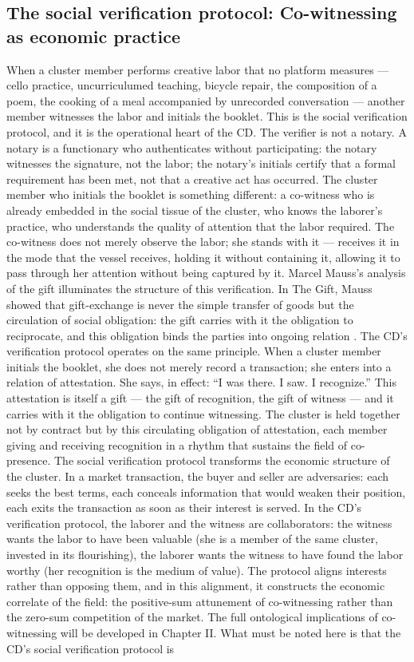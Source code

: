 \subsection{The social verification protocol: Co-witnessing as economic practice}

When a cluster member performs creative labor that no platform measures — cello practice, uncurriculumed teaching, bicycle repair, the composition of a poem, the cooking of a meal accompanied by unrecorded conversation — another member witnesses the labor and initials the booklet. This is the social verification protocol, and it is the operational heart of the CD. The verifier is not a notary. A notary is a functionary who authenticates without participating: the notary witnesses the signature, not the labor; the notary’s initials certify that a formal requirement has been met, not that a creative act has occurred. The cluster member who initials the booklet is something different: a co-witness who is already embedded in the social tissue of the cluster, who knows the laborer’s practice, who understands the quality of attention that the labor required. The co-witness does not merely observe the labor; she stands with it — receives it in the mode that the vessel receives, holding it without containing it, allowing it to pass through her attention without being captured by it. Marcel Mauss’s analysis of the gift illuminates the structure of this verification. In The Gift, Mauss showed that gift-exchange is never the simple transfer of goods but the circulation of social obligation: the gift carries with it the obligation to reciprocate, and this obligation binds the parties into ongoing relation \cite[pp.~39--46]{mauss_1990}. The CD’s verification protocol operates on the same principle. When a cluster member initials the booklet, she does not merely record a transaction; she enters into a relation of attestation. She says, in effect: “I was there. I saw. I recognize.” This attestation is itself a gift — the gift of recognition, the gift of witness — and it carries with it the obligation to continue witnessing. The cluster is held together not by contract but by this circulating obligation of attestation, each member giving and receiving recognition in a rhythm that sustains the field of co-presence. The social verification protocol transforms the economic structure of the cluster. In a market transaction, the buyer and seller are adversaries: each seeks the best terms, each conceals information that would weaken their position, each exits the transaction as soon as their interest is served. In the CD’s verification protocol, the laborer and the witness are collaborators: the witness wants the labor to have been valuable (she is a member of the same cluster, invested in its flourishing), the laborer wants the witness to have found the labor worthy (her recognition is the medium of value). The protocol aligns interests rather than opposing them, and in this alignment, it constructs the economic correlate of the field: the positive-sum attunement of co-witnessing rather than the zero-sum competition of the market. The full ontological implications of co-witnessing will be developed in Chapter II. What must be noted here is that the CD’s social verification protocol is 